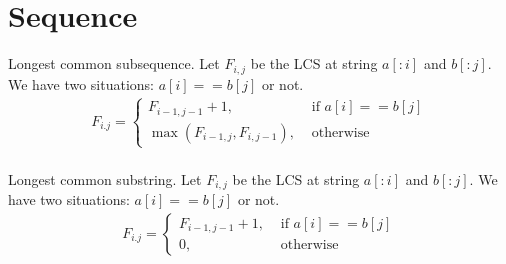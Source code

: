 \section{Sequence}
Longest common subsequence. Let $F_{i, j}$ be the LCS at string $a[:i]$ and $b[:j]$. We have two situations: $a[i]==b[j]$ or not.
\begin{eqnarray*}
F_{i. j} = \left\{ \begin{array}{rl}
  F_{i-1, j-1}+1, &\mbox{ if $a[i]==b[j]$} \\
  \max(F_{i-1, j}, F_{i,j-1}),&\mbox{ otherwise}
       \end{array} \right.
\end{eqnarray*}
\\
Longest common substring. Let $F_{i, j}$ be the LCS at string $a[:i]$ and
$b[:j]$. We have two situations: $a[i]==b[j]$ or not.
\begin{eqnarray*}
F_{i. j} = \left\{ \begin{array}{rl}
  F_{i-1, j-1}+1, &\mbox{ if $a[i]==b[j]$} \\
  0, &\mbox{ otherwise}
       \end{array} \right.
\end{eqnarray*}

